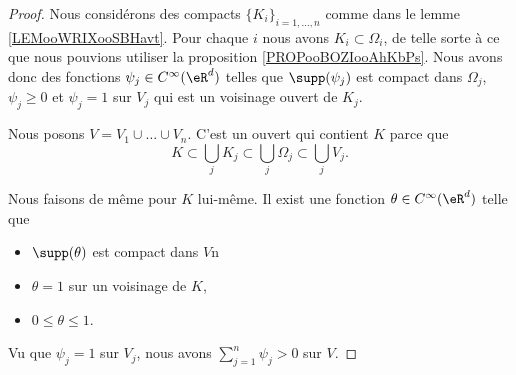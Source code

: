 \begin{proof}
    Nous considérons des compacts \( \{ K_i \}_{i=1,\ldots, n}\) comme dans le lemme \ref{LEMooWRIXooSBHavt}. Pour chaque \( i\) nous avons \( K_i\subset \Omega_i\), de telle sorte à ce que nous pouvions utiliser la proposition \ref{PROPooBOZIooAhKbPs}. Nous avons donc des fonctions \( \psi_j\in  C^{\infty}(\eR^d)\) telles que \( \supp(\psi_j)\) est compact dans \( \Omega_j\), \( \psi_j\geq 0\) et \( \psi_j=1\) sur \( V_j\) qui est un voisinage ouvert de \( K_j\).

    Nous posons \( V=V_1\cup\ldots \cup V_n\). C'est un ouvert qui contient \( K\) parce que
    \begin{equation}
        K\subset \bigcup_jK_j\subset\bigcup_j\Omega_j\subset \bigcup_jV_j.
    \end{equation}

    Nous faisons de même pour \( K\) lui-même. Il exist une fonction \( \theta\in  C^{\infty}(\eR^d)\) telle que
    \begin{itemize}
        \item \( \supp(\theta)\) est compact dans \( V\)n
        \item
            \( \theta=1\) sur un voisinage de \( K\),
        \item
            \( 0\leq \theta\leq 1\).
    \end{itemize}
    Vu que \( \psi_j=1\) sur \( V_j\), nous avons \( \sum_{j=1}^n\psi_j>0\) sur \( V\).


\end{proof}
